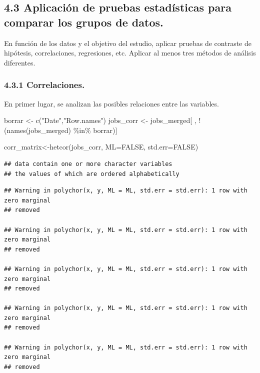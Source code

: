 \documentclass[
]{article}
\newenvironment{Shaded}{\begin{snugshade}}{\end{snugshade}}
\newcommand{\DataTypeTok}[1]{\textcolor[rgb]{0.87,0.87,0.75}{#1}}
\newcommand{\KeywordTok}[1]{\textcolor[rgb]{0.94,0.87,0.69}{#1}}
\newcommand{\NormalTok}[1]{\textcolor[rgb]{0.80,0.80,0.80}{#1}}
\newcommand{\OperatorTok}[1]{\textcolor[rgb]{0.94,0.94,0.82}{#1}}
\newcommand{\OtherTok}[1]{\textcolor[rgb]{0.94,0.94,0.56}{#1}}
\newcommand{\StringTok}[1]{\textcolor[rgb]{0.80,0.58,0.58}{#1}}
\begin{document}
\hypertarget{aplicaciuxf3n-de-pruebas-estaduxedsticas-para-comparar-los-grupos-de-datos.}{%
\subsection{4.3 Aplicación de pruebas estadísticas para comparar los
grupos de
datos.}\label{aplicaciuxf3n-de-pruebas-estaduxedsticas-para-comparar-los-grupos-de-datos.}}

En función de los datos y el objetivo del estudio, aplicar pruebas de
contraste de hipótesis, correlaciones, regresiones, etc. Aplicar al
menos tres métodos de análisis diferentes.

\hypertarget{correlaciones.}{%
\subsubsection{4.3.1 Correlaciones.}\label{correlaciones.}}

En primer lugar, se analizan las posibles relaciones entre las
variables.

\begin{Shaded}
\begin{Highlighting}[]
\NormalTok{borrar \textless{}{-}}\StringTok{ }\KeywordTok{c}\NormalTok{(}\StringTok{"Date"}\NormalTok{,}\StringTok{"Row.names"}\NormalTok{)}
\NormalTok{jobs\_corr \textless{}{-}}\StringTok{ }\NormalTok{jobs\_merged[ , }\OperatorTok{!}\NormalTok{(}\KeywordTok{names}\NormalTok{(jobs\_merged) }\OperatorTok{\%in\%}\StringTok{ }\NormalTok{borrar)]}

\NormalTok{corr\_matrix\textless{}{-}}\KeywordTok{hetcor}\NormalTok{(jobs\_corr, }\DataTypeTok{ML=}\OtherTok{FALSE}\NormalTok{, }\DataTypeTok{std.err=}\OtherTok{FALSE}\NormalTok{)}
\end{Highlighting}
\end{Shaded}

\begin{verbatim}
## data contain one or more character variables
## the values of which are ordered alphabetically
\end{verbatim}

\begin{verbatim}
## Warning in polychor(x, y, ML = ML, std.err = std.err): 1 row with zero marginal
## removed

## Warning in polychor(x, y, ML = ML, std.err = std.err): 1 row with zero marginal
## removed

## Warning in polychor(x, y, ML = ML, std.err = std.err): 1 row with zero marginal
## removed

## Warning in polychor(x, y, ML = ML, std.err = std.err): 1 row with zero marginal
## removed

## Warning in polychor(x, y, ML = ML, std.err = std.err): 1 row with zero marginal
## removed
\end{verbatim}
\end{document}
